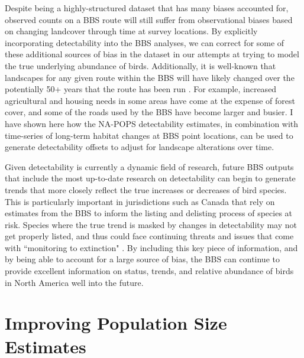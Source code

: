 \par Despite being a highly-structured dataset that has many biases accounted for, observed counts on a BBS route will still suffer from observational biases based on changing landcover through time at survey locations.
By explicitly incorporating detectability into the BBS analyses, we can correct for some of these additional sources of bias in the dataset in our attempts at trying to model the true underlying abundance of birds.
Additionally, it is well-known that landscapes for any given route within the BBS will have likely changed over the potentially 50+ years that the route has been run \citep{sauer_first_2017}.
For example, increased agricultural and housing needs in some areas have come at the expense of forest cover, and some of the roads used by the BBS have become larger and busier. 
I have shown here how the NA-POPS detectability estimates, in combination with time-series of long-term habitat changes at BBS point locations, can be used to generate detectability offsets to adjust for landscape alterations over time. 

\par Given detectability is currently a dynamic field of research, future BBS outputs that include the most up-to-date research on detectability can begin to generate trends that more closely reflect the true increases or decreases of bird species.
This is particularly important in jurisdictions such as Canada that rely on estimates from the BBS to inform the listing and delisting process of species at risk.
Species where the true trend is masked by changes in detectability may not get properly listed, and thus could face continuing threats and issues that come with ``monitoring to extinction" \citep{martin_acting_2012, lindenmayer_counting_2013}.
By including this key piece of information, and by being able to account for a large source of bias, the BBS can continue to provide excellent information on status, trends, and relative abundance of birds in North America well into the future.

\section{Improving Population Size Estimates}

